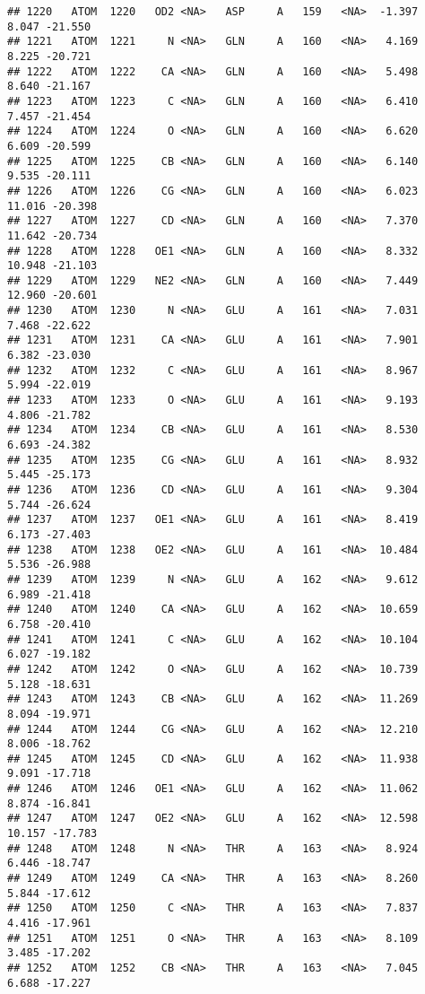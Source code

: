 \documentclass[
]{article}
\begin{document}
\begin{verbatim}
## 1220   ATOM  1220   OD2 <NA>   ASP     A   159   <NA>  -1.397   8.047 -21.550
## 1221   ATOM  1221     N <NA>   GLN     A   160   <NA>   4.169   8.225 -20.721
## 1222   ATOM  1222    CA <NA>   GLN     A   160   <NA>   5.498   8.640 -21.167
## 1223   ATOM  1223     C <NA>   GLN     A   160   <NA>   6.410   7.457 -21.454
## 1224   ATOM  1224     O <NA>   GLN     A   160   <NA>   6.620   6.609 -20.599
## 1225   ATOM  1225    CB <NA>   GLN     A   160   <NA>   6.140   9.535 -20.111
## 1226   ATOM  1226    CG <NA>   GLN     A   160   <NA>   6.023  11.016 -20.398
## 1227   ATOM  1227    CD <NA>   GLN     A   160   <NA>   7.370  11.642 -20.734
## 1228   ATOM  1228   OE1 <NA>   GLN     A   160   <NA>   8.332  10.948 -21.103
## 1229   ATOM  1229   NE2 <NA>   GLN     A   160   <NA>   7.449  12.960 -20.601
## 1230   ATOM  1230     N <NA>   GLU     A   161   <NA>   7.031   7.468 -22.622
## 1231   ATOM  1231    CA <NA>   GLU     A   161   <NA>   7.901   6.382 -23.030
## 1232   ATOM  1232     C <NA>   GLU     A   161   <NA>   8.967   5.994 -22.019
## 1233   ATOM  1233     O <NA>   GLU     A   161   <NA>   9.193   4.806 -21.782
## 1234   ATOM  1234    CB <NA>   GLU     A   161   <NA>   8.530   6.693 -24.382
## 1235   ATOM  1235    CG <NA>   GLU     A   161   <NA>   8.932   5.445 -25.173
## 1236   ATOM  1236    CD <NA>   GLU     A   161   <NA>   9.304   5.744 -26.624
## 1237   ATOM  1237   OE1 <NA>   GLU     A   161   <NA>   8.419   6.173 -27.403
## 1238   ATOM  1238   OE2 <NA>   GLU     A   161   <NA>  10.484   5.536 -26.988
## 1239   ATOM  1239     N <NA>   GLU     A   162   <NA>   9.612   6.989 -21.418
## 1240   ATOM  1240    CA <NA>   GLU     A   162   <NA>  10.659   6.758 -20.410
## 1241   ATOM  1241     C <NA>   GLU     A   162   <NA>  10.104   6.027 -19.182
## 1242   ATOM  1242     O <NA>   GLU     A   162   <NA>  10.739   5.128 -18.631
## 1243   ATOM  1243    CB <NA>   GLU     A   162   <NA>  11.269   8.094 -19.971
## 1244   ATOM  1244    CG <NA>   GLU     A   162   <NA>  12.210   8.006 -18.762
## 1245   ATOM  1245    CD <NA>   GLU     A   162   <NA>  11.938   9.091 -17.718
## 1246   ATOM  1246   OE1 <NA>   GLU     A   162   <NA>  11.062   8.874 -16.841
## 1247   ATOM  1247   OE2 <NA>   GLU     A   162   <NA>  12.598  10.157 -17.783
## 1248   ATOM  1248     N <NA>   THR     A   163   <NA>   8.924   6.446 -18.747
## 1249   ATOM  1249    CA <NA>   THR     A   163   <NA>   8.260   5.844 -17.612
## 1250   ATOM  1250     C <NA>   THR     A   163   <NA>   7.837   4.416 -17.961
## 1251   ATOM  1251     O <NA>   THR     A   163   <NA>   8.109   3.485 -17.202
## 1252   ATOM  1252    CB <NA>   THR     A   163   <NA>   7.045   6.688 -17.227

\end{verbatim}
\end{document}
